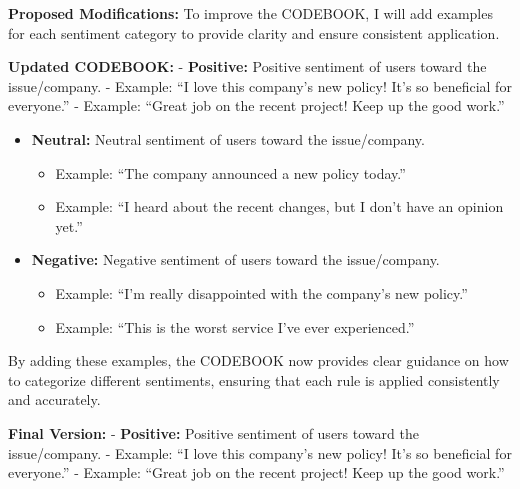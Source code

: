 \textbf{Proposed Modifications:} To improve the CODEBOOK, I will add
examples for each sentiment category to provide clarity and ensure
consistent application.

\textbf{Updated CODEBOOK:} - \textbf{Positive:} Positive sentiment of
users toward the issue/company. - Example: ``I love this company's new
policy! It's so beneficial for everyone.'' - Example: ``Great job on the
recent project! Keep up the good work.''

\begin{itemize}
\tightlist
\item
  \textbf{Neutral:} Neutral sentiment of users toward the issue/company.

  \begin{itemize}
  \tightlist
  \item
    Example: ``The company announced a new policy today.''
  \item
    Example: ``I heard about the recent changes, but I don't have an
    opinion yet.''
  \end{itemize}
\item
  \textbf{Negative:} Negative sentiment of users toward the
  issue/company.

  \begin{itemize}
  \tightlist
  \item
    Example: ``I'm really disappointed with the company's new policy.''
  \item
    Example: ``This is the worst service I've ever experienced.''
  \end{itemize}
\end{itemize}

By adding these examples, the CODEBOOK now provides clear guidance on
how to categorize different sentiments, ensuring that each rule is
applied consistently and accurately.

\textbf{Final Version:} - \textbf{Positive:} Positive sentiment of users
toward the issue/company. - Example: ``I love this company's new policy!
It's so beneficial for everyone.'' - Example: ``Great job on the recent
project! Keep up the good work.''

